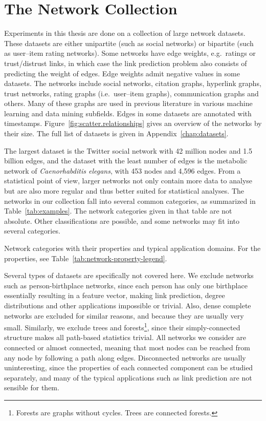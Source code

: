 \documentclass[11pt,a4paper]{book}
\begin{document}
\section{The Network Collection}
\label{sec:networks}
Experiments in this thesis are done on a collection of
large network datasets. 
These datasets
are either unipartite (such as social networks) or bipartite (such as
user--item rating networks).  Some networks have edge weights, e.g.\ ratings or
trust/distrust links, in which case the link prediction problem also
consists of predicting the weight of edges.  Edge weights admit negative
values in some datasets.  The networks include social networks, citation
graphs, hyperlink graphs, trust networks, rating graphs (i.e.\ user--item
graphs), communication graphs and others.  Many of these graphs are used
in previous literature in various machine learning and data mining
subfields.  Edges in some datasets are annotated with timestamps.
Figure~\ref{fig:scatter.relationships} gives an overview of the networks by their size.
The full list of datasets is given in Appendix~\ref{chap:datasets}. 

The largest dataset is the Twitter social network with 42 million nodes
and 1.5 billion 
edges, and the dataset with the least number of edges is the metabolic network of
\emph{Caenorhabditis elegans}, with 453 nodes and 4,596 edges. 
From a statistical point of view, larger networks not only
contain more data to analyse but are also more regular and thus better
suited for statistical analyses.  
The networks in our collection fall into several common categories, as summarized
in Table~\ref{tab:examples}.  
The network categories given in that table are not absolute.  Other
classifications are possible, and some networks may fit into several
categories. 

\begin{table}[h!]
  \centering
  \caption{
    Network categories with their properties and typical application
    domains. 
    For the properties, see Table~\ref{tab:network-property-legend}. 
  }
  \label{tab:examples}
  \scalebox{0.83}{
    
  }
  \vspace{0.5cm}
\end{table}

Several types of datasets are specifically not covered here.
We exclude networks such as person-birthplace networks, since each
person has only one birthplace essentially resulting in a feature
vector, making link prediction, degree distributions and other
applications impossible or trivial.  Also, dense complete networks are excluded for
similar reasons, and because they are usually very small.  Similarly, we
exclude trees and forests\footnote{Forests are graphs without cycles.
  Trees are connected forests.}, 
since their simply-connected structure makes
all path-based statistics trivial.  All networks we consider are
connected or almost connected, meaning that most nodes can be reached
from any node by following a path along edges.  Disconnected networks
are usually uninteresting, since the properties of each connected
component can be studied separately, and many of the typical
applications such as link prediction are not sensible for them.
\end{document}
